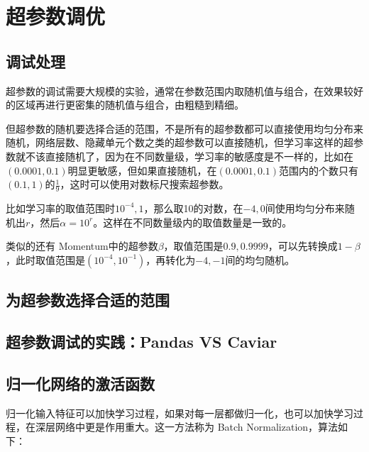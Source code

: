 \documentclass[../../main.tex]{subfiles}
\begin{document}
\chapter{超参数调优}

\section{调试处理}
超参数的调试需要大规模的实验，通常在参数范围内取随机值与组合，在效果较好的区域再进行更密集的随机值与组合，由粗糙到精细。


但超参数的随机要选择合适的范围，不是所有的超参数都可以直接使用均匀分布来随机，网络层数、隐藏单元个数之类的超参数可以直接随机，但学习率这样的超参数就不该直接随机了，因为在不同数量级，学习率的敏感度是不一样的，比如在\((0.0001, 0.1)\)明显更敏感，但如果直接随机，在\((0.0001, 0.1)\)范围内的个数只有\((0.1, 1)\)的\(\frac{1}{9}\)，这时可以使用对数标尺搜索超参数。

比如学习率的取值范围时\(10^{-4}, 1\)，那么取10的对数，在\(-4,0\)间使用均匀分布来随机出\(r\)，然后\(α=10^{r}\)。这样在不同数量级内的取值数量是一致的。

类似的还有 Momentum中的超参数\(β\)，取值范围是\(0.9, 0.9999\)，可以先转换成\(1-β\)，此时取值范围是\((10^{-4}, 10^{-1})\)，再转化为\(-4, -1\)间的均匀随机。

\section{为超参数选择合适的范围}

\section{超参数调试的实践：Pandas VS Caviar}

\section{归一化网络的激活函数}
归一化输入特征可以加快学习过程，如果对每一层都做归一化，也可以加快学习过程，在深层网络中更是作用重大。这一方法称为 Batch Normalization，算法如下：
\end{document}
